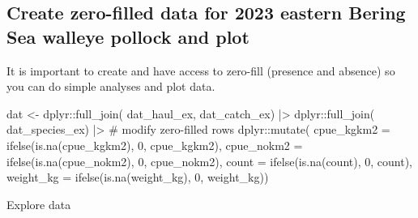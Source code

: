 \documentclass[
  letterpaper,
  oneside,
  open=any]{scrbook}
\newenvironment{Shaded}{\begin{snugshade}}{\end{snugshade}}
\newcommand{\AttributeTok}[1]{\textcolor[rgb]{0.40,0.45,0.13}{#1}}
\newcommand{\CommentTok}[1]{\textcolor[rgb]{0.37,0.37,0.37}{#1}}
\newcommand{\DecValTok}[1]{\textcolor[rgb]{0.68,0.00,0.00}{#1}}
\newcommand{\FunctionTok}[1]{\textcolor[rgb]{0.28,0.35,0.67}{#1}}
\newcommand{\NormalTok}[1]{\textcolor[rgb]{0.00,0.23,0.31}{#1}}
\newcommand{\OtherTok}[1]{\textcolor[rgb]{0.00,0.23,0.31}{#1}}
\newcommand{\SpecialCharTok}[1]{\textcolor[rgb]{0.37,0.37,0.37}{#1}}
\begin{document}
\subsection{Create zero-filled data for 2023 eastern Bering Sea walleye
pollock and
plot}\label{create-zero-filled-data-for-2023-eastern-bering-sea-walleye-pollock-and-plot}

It is important to create and have access to zero-fill (presence and
absence) so you can do simple analyses and plot data.

\begin{Shaded}
\begin{Highlighting}[]
\NormalTok{dat }\OtherTok{\textless{}{-}}\NormalTok{ dplyr}\SpecialCharTok{::}\FunctionTok{full\_join}\NormalTok{(}
\NormalTok{  dat\_haul\_ex,}
\NormalTok{  dat\_catch\_ex) }\SpecialCharTok{|\textgreater{}} 
\NormalTok{  dplyr}\SpecialCharTok{::}\FunctionTok{full\_join}\NormalTok{(}
\NormalTok{    dat\_species\_ex)  }\SpecialCharTok{|\textgreater{}} 
  \CommentTok{\# modify zero{-}filled rows}
\NormalTok{  dplyr}\SpecialCharTok{::}\FunctionTok{mutate}\NormalTok{(}
    \AttributeTok{cpue\_kgkm2 =} \FunctionTok{ifelse}\NormalTok{(}\FunctionTok{is.na}\NormalTok{(cpue\_kgkm2), }\DecValTok{0}\NormalTok{, cpue\_kgkm2),}
    \AttributeTok{cpue\_nokm2 =} \FunctionTok{ifelse}\NormalTok{(}\FunctionTok{is.na}\NormalTok{(cpue\_nokm2), }\DecValTok{0}\NormalTok{, cpue\_nokm2),}
    \AttributeTok{count =} \FunctionTok{ifelse}\NormalTok{(}\FunctionTok{is.na}\NormalTok{(count), }\DecValTok{0}\NormalTok{, count),}
    \AttributeTok{weight\_kg =} \FunctionTok{ifelse}\NormalTok{(}\FunctionTok{is.na}\NormalTok{(weight\_kg), }\DecValTok{0}\NormalTok{, weight\_kg))}
\end{Highlighting}
\end{Shaded}

Explore data
\end{document}
